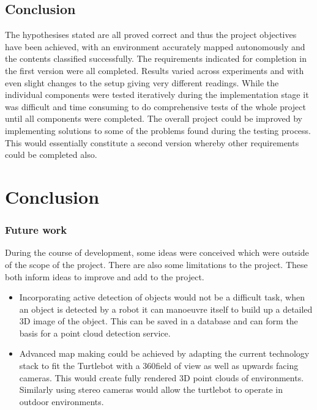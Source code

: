 \documentclass{mproj}
\begin{document}
\section{Conclusion}

The hypothesises stated are all proved correct and thus the project objectives have been achieved, with an environment accurately mapped autonomously and the contents classified successfully. The requirements indicated for completion in the first version were all completed. Results varied across experiments and with even slight changes to the setup giving very different readings. While the individual components were tested iteratively during the implementation stage it was difficult and time consuming to do comprehensive tests of the whole project until all components were completed. The overall project could be improved by implementing solutions to some of the problems found during the testing process. This would essentially constitute a  second version whereby other requirements could be completed also. 

\chapter{Conclusion}\label{conclusion}

\subsection{Future work}

During the course of development, some ideas were conceived which were outside of the scope of the project. There are also some limitations to the project. These both inform ideas to improve and add to the project.

\begin{itemize}
\item Incorporating active detection of objects would not be a difficult task, when an object is detected by a robot it can manoeuvre itself to build up a detailed 3D image of the object. This can be saved in a database and can form the basis for a point cloud detection service.
\item Advanced map making could be achieved by adapting the current technology stack to fit the Turtlebot with a 360\degree field of view as well as upwards facing cameras. This would create fully rendered 3D point clouds of environments. Similarly using stereo cameras would allow the turtlebot to operate in outdoor environments. 
\end{itemize}
\end{document}
